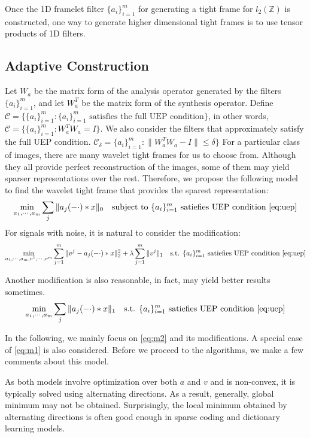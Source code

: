 \documentclass[a4paper]{article}
\begin{document}
Once the 1D framelet filter $\{a_i\}_{i=1}^m$ for generating a tight frame for $l_2(\mathbb{Z})$ is constructed, one way to generate higher dimensional tight frames is to use tensor products of 1D filters.


\subsection{Adaptive Construction}
Let $W_a$ be the matrix form of the analysis operator generated by the filters $\{a_i\}_{i=1}^m$, and let $W^T_a$ be the matrix form of the synthesis operator. Define $\mathcal{C}=\{ \{a_i\}_{i=1}^m : \{a_i\}_{i=1}^m  \textrm{ satisfies the full UEP condition}\}$, in other words, $\mathcal{C}=\{ \{a_i\}_{i=1}^m : W_a^TW_a=I\}$. We also consider the filters that approximately satisfy the full UEP condition. $\mathcal{C}_\delta = \{a_i\}_{i=1}^m : \|W_a^TW_a -I\|\leq \delta\}$
For a particular class of images, there are many wavelet tight frames for us to choose from. Although they all provide perfect reconstruction of the images, some of them may yield sparser representations over the rest. Therefore, we propose the following model to find the wavelet tight frame that provides the sparest representation:
\begin{equation}
	\min_{a_1,\cdots,a_m} \sum_j \|a_j(-\cdot)*x\|_0 \quad \textrm{subject to } \{a_i\}_{i=1}^m \textrm{ satiefies UEP condition \eqref{eq:uep}}
\end{equation}
For signals with noise, it is natural to consider the modification:
\begin{equation}
\label{eq:m1}
	\min_{a_1,\cdots,a_m,v^1,\cdots,v^m}  \sum_{j=1}^m \|v^j - a_j(-\cdot)*x\|_2^2 + \lambda \sum_{j=1}^m \|v^j\|_1 \quad \textrm{s.t. } \{a_i\}_{i=1}^m \textrm{ satiefies UEP condition \eqref{eq:uep}}
\end{equation}

Another modification is also reasonable, in fact, may yield better results sometimes.
\begin{equation}
\label{eq:m2}
	\min_{a_1,\cdots,a_m}  \sum_j \|a_j(-\cdot)*x\|_1 \quad \textrm{s.t. } \{a_i\}_{i=1}^m \textrm{ satiefies UEP condition \eqref{eq:uep}}
\end{equation}

In the following, we mainly focus on \eqref{eq:m2} and its modifications. A special case of \eqref{eq:m1} is also considered.
Before we proceed to the algorithms, we make a few comments about this model. 

As both models involve optimization over both $a$ and $v$ and is non-convex, it is typically solved using alternating directions. As a result, generally, global minimum may not be obtained. Surprisingly, the local minimum obtained by alternating directions is often good enough in sparse coding and dictionary  learning models.
\end{document}
